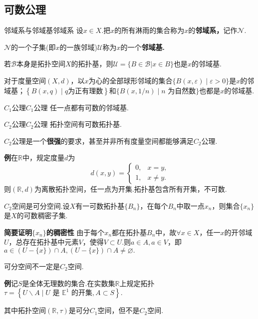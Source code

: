 \documentclass{ctexart}
\begin{document}
\subsection{可数公理}
\begin{定义}{邻域系与邻域基}{邻域系}
	设$x \in X.$把$x$的所有淋雨的集合称为$x$的\textbf{邻域系，}记作$\mathscr{N}.$
	
	$\mathscr{N}$的一个子集(即$x$的一族邻域)$\mathscr{U}$称为$x$的一个\textbf{邻域基.}
\end{定义}
\begin{命题}{}{}
	若$\mathscr{B}$本身是拓扑空间$X$的拓扑基，则${\mathscr{U}}=\{B{\in}\mathscr{B}|x{\in}B\}$也是$x$的邻域基.
\end{命题}
\begin{结论}{}{}
	对于度量空间$(X,d)$，以$x$为心的全部球形邻域的集合$\{B(x,\varepsilon)\mid\varepsilon>0\}$是$x$的邻域基；$\left\{B(x,q)\mid q\text{为正有理数}\right\}$和$\{B(x,1/n)\mid n\text{ 为自然数}\}$也都是$x$的邻域基.
\end{结论}
\begin{定义}{$C_1$公理}{$C_1$公理}
	任一点都有可数的邻域基.
\end{定义}
\begin{定义}{$C_2$公理}{$C_2$公理}
	拓扑空间有可数拓扑基.
\end{定义}
\begin{注意}
	$C_2$公理是一个\textbf{很强}的要求，甚至并非所有度量空间都能够满足$C_2$公理.
	
	\textbf{例}\quad 在$\mathbb{R}$中，规定度量$d$为
	$$
	d(x,y)=
	\begin{cases}
		0,&x=y\text{,}\\
		1,&x\neq y.
	\end{cases}
	$$
	则$(\mathbb{R},d)$为离散拓扑空间，任一点为开集.拓扑基包含所有开集，不可数.
\end{注意}
\begin{命题}{}{}
	$C_2$空间是可分空间.设$X$有一可数拓扑基$\{B_{n}\}$，在每个$B_n$中取一点$x_n$，则集合$ \{x_{n}\}$是$X$的可数稠密子集.
	
	\textbf{简要证明$ \{x_{n}\}$的稠密性}
	由于每个$x_n $都在拓扑基$B_n$中，故$\forall x \in X$，任一$x$的开邻域$U$，总存在拓扑基中元素$V$，使得$V \subset U$.则$a\in A,a\in V$，即$a\in(U-\{x\})\cap A,(U-\{x\})\cap A\neq\varnothing .$	
\end{命题}
\begin{注意}
	可分空间不一定是$C_2$空间.
	
	\textbf{例}\quad 记$S$是全体无理数的集合.在实数集$\mathbb{R}$上规定拓扑$\tau = \left\{U\backslash A \mid U\text{ 是 }\mathbb{E}^1\text{ 的开集},A\subset S \right\} .$
	
	其中拓扑空间$(\mathbb{R},\tau)$是可分$C_1$空间，但不是$C_2$空间.
	\end{注意}
\end{document}
